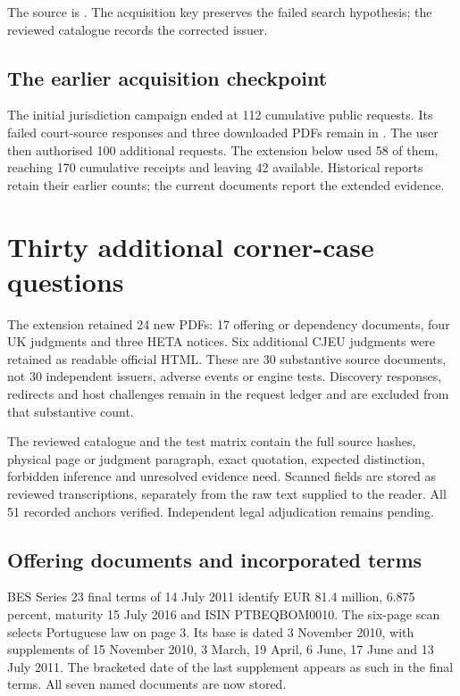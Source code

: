 The source is
.
The acquisition key preserves the failed search hypothesis; the reviewed
catalogue records the corrected issuer.

\subsection{The earlier acquisition checkpoint}

The initial jurisdiction campaign ended at 112 cumulative public requests.
Its failed court-source responses and three downloaded PDFs remain in
. The user then authorised
100 additional requests. The extension below used 58 of them, reaching
170 cumulative receipts and leaving 42 available. Historical reports retain
their earlier counts; the current documents report the extended evidence.

\section{Thirty additional corner-case questions}
\label{app:corner-cases-2026}

The extension retained 24 new PDFs: 17 offering or dependency documents,
four UK judgments and three HETA notices. Six additional CJEU judgments
were retained as readable official HTML. These are 30 substantive source
documents, not 30 independent issuers, adverse events or engine tests.
Discovery responses, redirects and host challenges remain in the request
ledger and are excluded from that substantive count.

The reviewed catalogue and the test matrix contain the full source hashes,
physical page or judgment paragraph, exact quotation, expected distinction,
forbidden inference and unresolved evidence need. Scanned fields are stored
as reviewed transcriptions, separately from the raw text supplied to the
reader. All 51 recorded anchors verified. Independent legal adjudication
remains pending.

\subsection{Offering documents and incorporated terms}

BES Series 23 final terms of 14 July 2011 identify EUR 81.4 million,
6.875 percent, maturity 15 July 2016 and ISIN PTBEQBOM0010.
The six-page scan selects Portuguese law on page 3.
Its base is dated 3 November 2010, with supplements of 15 November 2010,
3 March, 19 April, 6 June, 17 June and 13 July 2011.
The bracketed date of the last supplement appears as such in the final terms.
All seven named documents are now stored.

